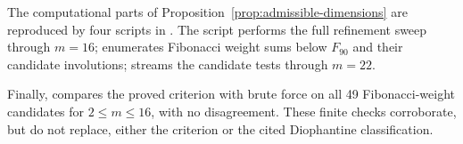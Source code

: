 \documentclass[12pt,a4paper]{article}
\theoremstyle{plain}
\theoremstyle{definition}
\numberwithin{equation}{section}
\begin{document}
The computational parts of Proposition~\ref{prop:admissible-dimensions} are reproduced
by four scripts in .  The script 
performs the full refinement sweep through \(m=16\);
 enumerates Fibonacci weight sums below \(F_{90}\)
and their candidate involutions;  streams the
candidate tests through \(m=22\).

Finally,  compares the proved criterion with
brute force on all 49 Fibonacci-weight candidates for
\(2\le m\le16\), with no disagreement.  These finite checks corroborate, but do not
replace, either the criterion or the cited Diophantine classification.



\end{document}
